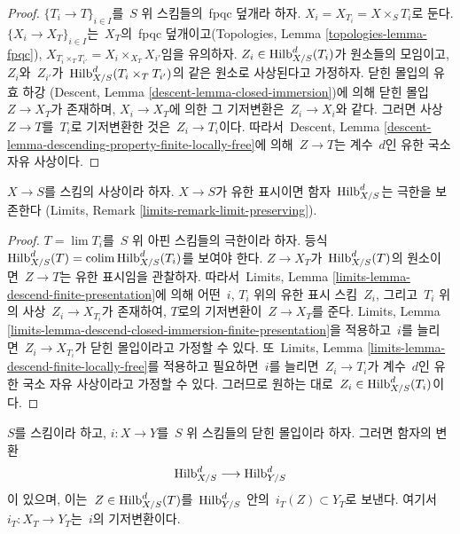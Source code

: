 \begin{proof}
$\{T_i \to T\}_{i \in I}$를\  $S$ 위 스킴들의\  fpqc 덮개라 하자.
$X_i = X_{T_i} = X \times_S T_i$로 둔다.
$\{X_i \to X_T\}_{i \in I}$는\ 
$X_T$의\  fpqc 덮개이고(Topologies, Lemma \ref{topologies-lemma-fpqc}),
$X_{T_i \times_T T_{i'}} = X_i \times_{X_T} X_{i'}$임을 유의하자.
$Z_i \in \mathrm{Hilb}^d_{X/S}(T_i)$가 원소들의 모임이고, $Z_i$와\ 
$Z_{i'}$가\  $\mathrm{Hilb}^d_{X/S}(T_i \times_T T_{i'})$의 같은 원소로
사상된다고 가정하자. 닫힌 몰입의 유효 하강
(Descent, Lemma \ref{descent-lemma-closed-immersion})에 의해 닫힌 몰입\ 
$Z \to X_T$가 존재하며, $X_i \to X_T$에 의한 그 기저변환은\ 
$Z_i \to X_i$와 같다. 그러면 사상\  $Z \to T$를\  $T_i$로 기저변환한 것은\ 
$Z_i \to T_i$이다. 따라서\  Descent, Lemma
\ref{descent-lemma-descending-property-finite-locally-free}에 의해\ 
$Z \to T$는 계수\  $d$인 유한 국소 자유 사상이다.
\end{proof}

\begin{lemma}
\label{lemma-hilb-d-limit-preserving}
$X \to S$를 스킴의 사상이라 하자. $X \to S$가 유한 표시이면 함자\ 
$\mathrm{Hilb}^d_{X/S}$는 극한을 보존한다
(Limits, Remark \ref{limits-remark-limit-preserving}).
\end{lemma}

\begin{proof}
$T = \lim T_i$를\  $S$ 위 아핀 스킴들의 극한이라 하자. 등식\ 
$\mathrm{Hilb}^d_{X/S}(T) = \mathop{\mathrm{colim}}\nolimits \mathrm{Hilb}^d_{X/S}(T_i)$를
보여야 한다. $Z \to X_T$가\  $\mathrm{Hilb}^d_{X/S}(T)$의 원소이면\ 
$Z \to T$는 유한 표시임을 관찰하자. 따라서\  Limits, Lemma
\ref{limits-lemma-descend-finite-presentation}에 의해 어떤\  $i$, $T_i$ 위의
유한 표시 스킴\  $Z_i$, 그리고\  $T_i$ 위의 사상\  $Z_i \to X_{T_i}$가
존재하여, $T$로의 기저변환이\  $Z \to X_T$를 준다. Limits, Lemma
\ref{limits-lemma-descend-closed-immersion-finite-presentation}을 적용하고\ 
$i$를 늘리면\  $Z_i \to X_{T_i}$가 닫힌 몰입이라고 가정할 수 있다.
또\  Limits, Lemma \ref{limits-lemma-descend-finite-locally-free}를 적용하고
필요하면\  $i$를 늘리면\  $Z_i \to T_i$가 계수\  $d$인 유한 국소 자유
사상이라고 가정할 수 있다. 그러므로 원하는 대로\ 
$Z_i \in \mathrm{Hilb}^d_{X/S}(T_i)$이다.
\end{proof}

\noindent
$S$를 스킴이라 하고, $i : X \to Y$를\  $S$ 위 스킴들의 닫힌 몰입이라 하자.
그러면 함자의 변환
$$
\mathrm{Hilb}^d_{X/S} \longrightarrow \mathrm{Hilb}^d_{Y/S}
$$
이 있으며, 이는\  $Z \in \mathrm{Hilb}^d_{X/S}(T)$를\ 
$\mathrm{Hilb}^d_{Y/S}$ 안의\  $i_T(Z) \subset Y_T$로 보낸다. 여기서\ 
$i_T : X_T \to Y_T$는\  $i$의 기저변환이다.

